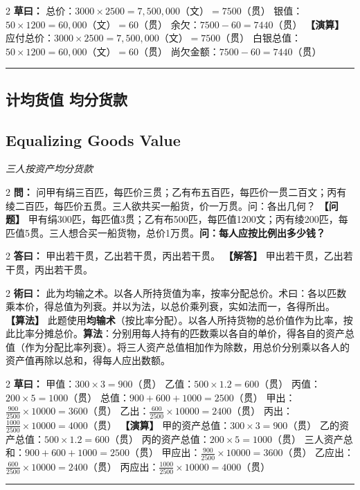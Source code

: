 \documentclass[11pt,a4paper]{article}
\newcommand{\longline}{\noindent\rule{\textwidth}{0.4pt}}
\newcommand{\bilingualProblem}[2]{%
  \vspace{0.6em}%
  \begin{paracol}{2}%
  \noindent\textcolor{problemcolor}{\textbf{問：}}#1%
  \switchcolumn%
  \noindent\textcolor{problemcolor}{\textbf{【问题】}}#2%
  \end{paracol}%
  \vspace{0.3em}%
}
\newcommand{\bilingualAnswer}[2]{%
  \begin{paracol}{2}%
  \noindent\textcolor{answercolor}{\textbf{答曰：}}#1%
  \switchcolumn%
  \noindent\textcolor{answercolor}{\textbf{【解答】}}#2%
  \end{paracol}%
  \vspace{0.3em}%
}
\newcommand{\bilingualMethod}[2]{%
  \begin{paracol}{2}%
  \noindent\textcolor{methodcolor}{\textbf{術曰：}}#1%
  \switchcolumn%
  \noindent\textcolor{methodcolor}{\textbf{【算法】}}#2%
  \end{paracol}%
  \vspace{0.3em}%
}
\newcommand{\bilingualWorking}[2]{%
  \begin{paracol}{2}%
  \noindent\textcolor{workingcolor}{\textbf{草曰：}}#1%
  \switchcolumn%
  \noindent\textcolor{workingcolor}{\textbf{【演算】}}#2%
  \end{paracol}%
  \vspace{0.3em}%
}
\newcommand{\bilingualSubsection}[2]{%
  \subsection{#1}
  \begin{center}
  {\small\color{sectioncolor}\textit{#2}}
  \end{center}
  \vspace{0.3em}
}
\begin{document}
\bilingualWorking{%
总价：$3000 \times 2500 = 7{,}500{,}000$（文）$= 7500$（贯）
银值：$50 \times 1200 = 60{,}000$（文）$= 60$（贯）
余欠：$7500 - 60 = 7440$（贯）%
}{%
应付总价：$3000 \times 2500 = 7{,}500{,}000$（文）$= 7500$（贯）
白银总值：$50 \times 1200 = 60{,}000$（文）$= 60$（贯）
尚欠金额：$7500 - 60 = 7440$（贯）%
}

\vspace{0.5em}
\longline

\subsection{计均货值 \quad 均分货款}
\bilingualSubsection{Equalizing Goods Value}{三人按资产均分货款}

\bilingualProblem{%
问甲有绢三百匹，每匹价三贯；乙有布五百匹，每匹价一贯二百文；丙有绫二百匹，每匹价五贯。三人欲共买一船货，价一万贯。问：各出几何？%
}{%
甲有绢300匹，每匹值3贯；乙有布500匹，每匹值1200文；丙有绫200匹，每匹值5贯。三人想合买一船货物，总价1万贯。\textbf{问：每人应按比例出多少钱？}%
}

\bilingualAnswer{%
甲出若干贯，乙出若干贯，丙出若干贯。%
}{%
甲出若干贯，乙出若干贯，丙出若干贯。%
}

\bilingualMethod{%
此为均输之术。以各人所持货值为率，按率分配总价。术曰：各以匹数乘本价，得总值为列衰。并以为法，以总价乘列衰，实如法而一，各得所出。%
}{%
此题使用\textbf{均输术}（按比率分配）。以各人所持货物的总价值作为比率，按此比率分摊总价。\textbf{算法}：分别用每人持有的匹数乘以各自的单价，得各自的资产总值（作为分配比率列衰）。将三人资产总值相加作为除数，用总价分别乘以各人的资产值再除以总和，得每人应出数额。%
}

\bilingualWorking{%
甲值：$300 \times 3 = 900$（贯）
乙值：$500 \times 1.2 = 600$（贯）
丙值：$200 \times 5 = 1000$（贯）
总值：$900 + 600 + 1000 = 2500$（贯）
甲出：$\displaystyle\frac{900}{2500} \times 10000 = 3600$（贯）
乙出：$\displaystyle\frac{600}{2500} \times 10000 = 2400$（贯）
丙出：$\displaystyle\frac{1000}{2500} \times 10000 = 4000$（贯）%
}{%
甲的资产总值：$300 \times 3 = 900$（贯）
乙的资产总值：$500 \times 1.2 = 600$（贯）
丙的资产总值：$200 \times 5 = 1000$（贯）
三人资产总和：$900 + 600 + 1000 = 2500$（贯）
甲应出：$\displaystyle\frac{900}{2500} \times 10000 = 3600$（贯）
乙应出：$\displaystyle\frac{600}{2500} \times 10000 = 2400$（贯）
丙应出：$\displaystyle\frac{1000}{2500} \times 10000 = 4000$（贯）%
}

\vspace{0.5em}
\longline
\end{document}
